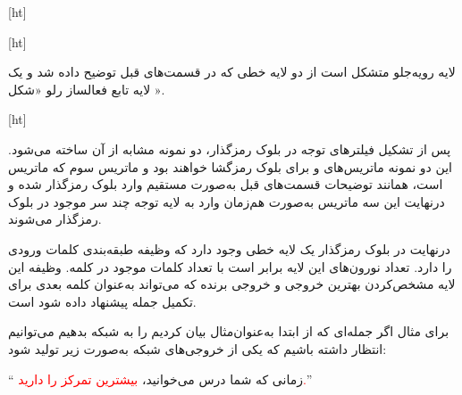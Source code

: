 [ht]



[ht]








لایه رو‌یه‌جلو متشکل است از دو لایه خطی که در قسمت‌های قبل توضیح داده شد و یک لایه تابع فعالساز رلو «شکل ».


[ht]




پس از تشکیل فیلترهای توجه در بلوک رمزگذار، دو نمونه مشابه از آن ساخته می‌شود. این دو نمونه ماتریس‌های  و  برای بلوک رمزگشا خواهند بود و ماتریس سوم که ماتریس  است، همانند توضیحات قسمت‌های قبل به‌صورت مستقیم وارد بلوک رمزگذار شده و درنهایت این سه ماتریس به‌صورت هم‌زمان وارد به لایه توجه چند سر موجود در بلوک رمزگذار می‌شوند.


درنهایت در بلوک رمزگذار یک لایه خطی وجود دارد که وظیفه طبقه‌بندی کلمات ورودی را دارد. تعداد نورون‌های این لایه برابر است با تعداد کلمات موجود در کلمه. وظیفه این لایه مشخص‌کردن بهترین خروجی و خروجی برنده که می‌تواند به‌عنوان کلمه بعدی برای تکمیل جمله پیشنهاد داده شود است.


برای مثال اگر جمله‌ای که از ابتدا به‌عنوان‌مثال بیان کردیم را به شبکه بدهیم می‌توانیم انتظار داشته باشیم که یکی از خروجی‌های شبکه به‌صورت زیر تولید شود:


`` زمانی که شما درس می‌خوانید، \textcolor{red}{بیشترین تمرکز را دارید.}''
